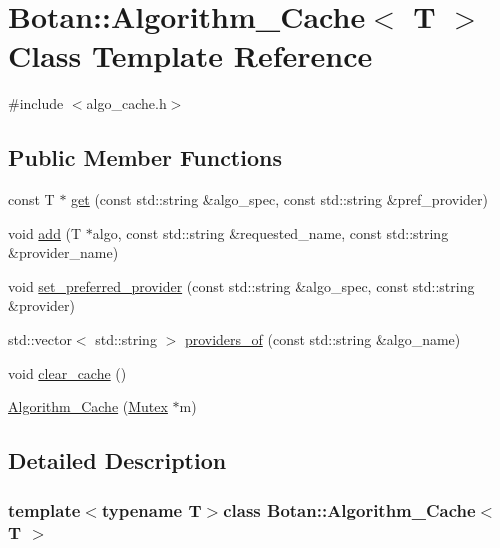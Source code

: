 \hypertarget{classBotan_1_1Algorithm__Cache}{\section{Botan\-:\-:Algorithm\-\_\-\-Cache$<$ T $>$ Class Template Reference}
\label{classBotan_1_1Algorithm__Cache}
}


{\ttfamily \#include $<$algo\-\_\-cache.\-h$>$}

\subsection*{Public Member Functions}
\begin{DoxyCompactItemize}
\item 
const T $\ast$ \hyperlink{classBotan_1_1Algorithm__Cache_a7cc4676a7576c1dc921ca5564fe637e0}{get} (const std\-::string \&algo\-\_\-spec, const std\-::string \&pref\-\_\-provider)
\item 
void \hyperlink{classBotan_1_1Algorithm__Cache_a9dd5c9af1667e3d9e56d7985ed58a17c}{add} (T $\ast$algo, const std\-::string \&requested\-\_\-name, const std\-::string \&provider\-\_\-name)
\item 
void \hyperlink{classBotan_1_1Algorithm__Cache_a8be5ad1ad3c0aea9cbfd766c6f84a325}{set\-\_\-preferred\-\_\-provider} (const std\-::string \&algo\-\_\-spec, const std\-::string \&provider)
\item 
std\-::vector$<$ std\-::string $>$ \hyperlink{classBotan_1_1Algorithm__Cache_a5cc15c771e4f045b257af0f3997aa33f}{providers\-\_\-of} (const std\-::string \&algo\-\_\-name)
\item 
void \hyperlink{classBotan_1_1Algorithm__Cache_a51a201e3a73394738c00a189520641b8}{clear\-\_\-cache} ()
\item 
\hyperlink{classBotan_1_1Algorithm__Cache_ace8eaefcb3a4aac5c12f747ccc5f5ef1}{Algorithm\-\_\-\-Cache} (\hyperlink{classBotan_1_1Mutex}{Mutex} $\ast$m)
\end{DoxyCompactItemize}


\subsection{Detailed Description}
\subsubsection*{template$<$typename T$>$class Botan\-::\-Algorithm\-\_\-\-Cache$<$ T $>$}

